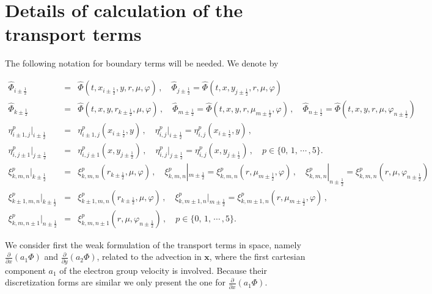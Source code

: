 \documentclass[11pt]{article}
\newcommand{\bx}{\mathbf{x}}
\newcommand{\ot}{\frac{1}{2}}
\begin{document}
\section{Details of calculation  of the transport terms} 
\label{sec:trans}

The following notation for boundary terms will be needed. We denote by 

\begin{eqnarray}
 \hat{\Phi}_{i \pm \frac{1}{2}} & = & \hat{\Phi}(t,x_{i \pm \frac{1}{2}}, y, r, \mu, \varphi) \, , \quad
 \hat{\Phi}_{j \pm \frac{1}{2}} = \hat{\Phi}(t,x, y_{j \pm \frac{1}{2}}, r, \mu, \varphi) \\
 \hat{\Phi}_{k \pm \frac{1}{2}} & = & \hat{\Phi}(t,x, y, r_{k \pm \frac{1}{2}}, \mu, \varphi) \, , \quad
 \hat{\Phi}_{m \pm \frac{1}{2}} = \hat{\Phi}(t,x, y, r, \mu_{m \pm \frac{1}{2}}, \varphi) \, , \quad 
 \hat{\Phi}_{n \pm \frac{1}{2}} = \hat{\Phi}(t,x, y, r, \mu, \varphi_{n \pm \frac{1}{2}}) \nonumber\\
\eta^{p}_{i \pm 1,j}|_{i \pm \ot} & = & \eta^{p}_{i \pm 1,j}(x_{i \pm \ot},y) \, , \quad \eta^{p}_{i,j}|_{i \pm \ot} = \eta^{p}_{i,j}(x_{i \pm \ot},y) \, , \quad
\\
\eta^{p}_{i,j \pm 1}|_{j \pm \ot} & = & \eta^{p}_{i ,j \pm 1}(x,y_{j \pm \ot}) \, , \quad \eta^{p}_{i,j}|_{j \pm \ot} = \eta^{p}_{i,j}(x,y_{j \pm \ot}) \, , \quad
p \in \{ 0, \, 1, \, \cdots \, , 5 \} . \nonumber\\
\xi^{p}_{k,m,n}|_{k \pm \ot} & = & \xi^{p}_{k,m,n}(r_{k \pm \ot},\mu,\varphi) \, , \quad 
\xi^{p}_{k,m,n}|_{m \pm \ot}  =  \xi^{p}_{k,m,n}(r, \mu_{m \pm \ot},\varphi) \, , \quad 
\xi^{p}_{k,m,n}|_{n \pm \ot}  =  \xi^{p}_{k,m,n}(r,\mu,\varphi_{n \pm \ot}) \quad \nonumber\\
\xi^{p}_{k \pm 1,m,n}|_{k \pm \ot} & = & \xi^{p}_{k \pm 1,m,n}(r_{k \pm \ot},\mu,\varphi) \, , \quad 
\xi^{p}_{k,m\pm 1,n}|_{m \pm \ot}  =  \xi^{p}_{k,m\pm 1,n}(r, \mu_{m \pm \ot},\varphi) \, , \\
\xi^{p}_{k,m,n\pm 1}|_{n \pm \ot}  & = &  \xi^{p}_{k,m,n\pm 1}(r,\mu,\varphi_{n \pm \ot}) \, , \quad p \in \{ 0, \, 1, \, \cdots \, , 5 \}. \nonumber
\end{eqnarray}




We consider first the weak formulation of the transport terms in space, namely $ \frac{\partial}{\partial x} \left( a_1 \Phi \right) $ and $ \frac{\partial}{\partial y} \left( a_2 \Phi \right) $, related to the advection in $\bx$, where the first cartesian component $a_1$ of the electron group velocity is involved. Because their discretization forms are similar we only present the one for $ \frac{\partial}{\partial x} \left( a_1 \Phi \right) $.
\end{document}
